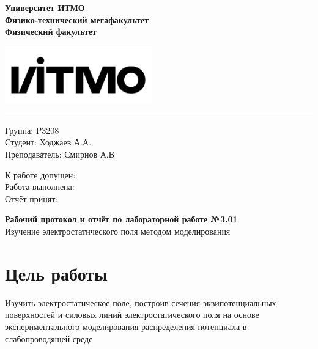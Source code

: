 \documentclass[12pt]{extarticle}
\begin{document}
    \begin{minipage}{0.5\textwidth}
        \begin{center}
            \begin{small}
                \textsf{\textbf{Университет ИТМО}} \\
                \textsf{\textbf{Физико-технический мегафакультет}} \\
                \textsf{\textbf{Физический факультет}}
            \end{small}
        \end{center}
    \end{minipage}
    \hfill
    \begin{minipage}{0.4\textwidth}
        \includegraphics[height=2.5cm]{itmo.png}
    \end{minipage}
    \hrule
    \vspace{8mm}
    \begin{minipage}{0.4\textwidth}
        Группа: P3208 \\ %
        Студент: Ходжаев А.А. \\ %
        Преподаватель: Смирнов А.В %
    \end{minipage}
    \hfill
    \begin{minipage}{0.4\textwidth}
        К работе допущен: \\
        Работа выполнена: \\
        Отчёт принят: 
    \end{minipage}
    \vspace{8mm}
    \begin{center}
        \begin{Large}
            \textbf{Рабочий протокол и отчёт по лабораторной работе №3.01} \\ %
            Изучение электростатического поля методом моделирования %
        \end{Large}
    \end{center}
    \vspace{8mm}
 
    \section{Цель работы}
    Изучить электростатическое поле, построив сечения эквипотенциальных поверхностей и силовых линий электростатического поля на основе экспериментального моделирования распределения потенциала в слабопроводящей среде
\end{document}
